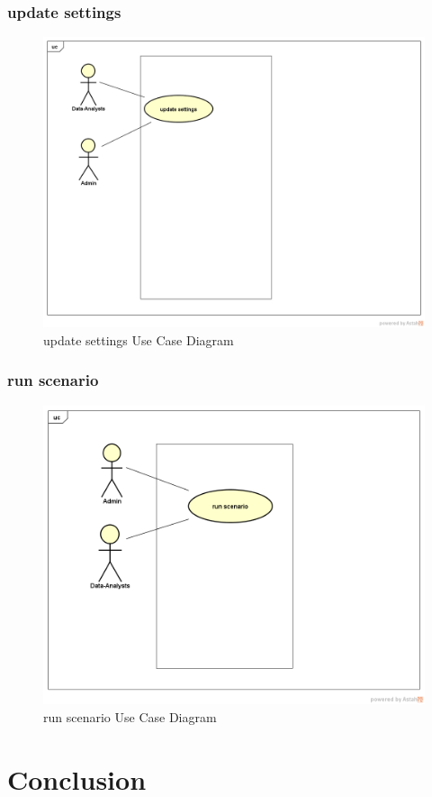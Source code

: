 \documentclass[12pt]{article}
\begin{document}
	 \subsubsection{update settings}
	 	\begin{figure}[h]
	 	\centering
	 	\includegraphics[width=1.0\textwidth]{updateSettings.png}
	 	\caption{update settings Use Case Diagram}
	 	
	 \end{figure}
 \clearpage
 \newpage
	 \subsubsection{run scenario}
	 	\begin{figure}[h]
	 	\centering
	 	\includegraphics[width=1.0\textwidth]{runScenario.png}
	 	\caption{run scenario Use Case Diagram}
	 	
	 \end{figure}
	
	
	\clearpage
	\newpage
	
	\section{Conclusion}
	
\end{document}
